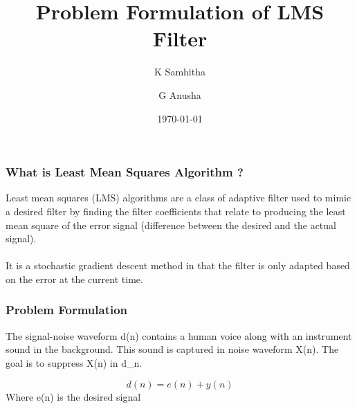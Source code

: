 \documentclass{beamer}
\title[]{Problem Formulation of LMS Filter} %
\author[K Samhitha , G Anusha] %
{K Samhitha\inst{1} \and G Anusha\inst{2}}
\institute[IITH] %
{
  \inst{1}%
  EE16BTECH11019\\
  \and
  \inst{2}%
  EE16BTECH11011\\
  }
\date{\today} %
\begin{document}
\begin{frame}
\titlepage %
\end{frame}





\begin{frame}
\frametitle{What is Least Mean Squares Algorithm ?}
Least mean squares (LMS) algorithms are a class of adaptive filter used to mimic a desired filter by finding the filter coefficients that relate to producing the least mean square of the error signal (difference between the desired and the actual signal). \\
\\
It is a stochastic gradient descent method in that the filter is only adapted based on the error at the current time.



\end{frame}

\begin{frame}
\frametitle{Problem Formulation}
The signal-noise waveform d(n) contains a human voice along with an instrument sound in the background.
This sound is captured in noise waveform X(n).
The goal is to suppress X(n) in 
d_n.\\
\begin{center}
\begin{equation*}
     d(n) = e(n) + y(n)
\end{equation*}
Where e(n) is the desired signal\\
\end{center}




\end{frame}




\end{document}

